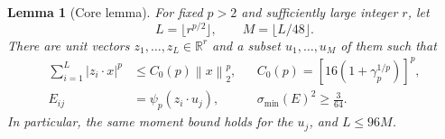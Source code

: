 \documentclass[11pt,letterpaper]{article}
\newtheorem{lemma}[theorem]{Lemma}
\theoremstyle{definition}
\theoremstyle{remark}
\numberwithin{equation}{section}
\newcommand{\R}{\mathbb R}
\newcommand{\norm}[1]{\left\lVert#1\right\rVert}
\begin{document}
\begin{lemma}[Core lemma]\label{lem:core}
For fixed $p>2$ and sufficiently large integer $r$, let
\begin{equation}\label{eq:corecounts}
 L=\lfloor r^{p/2}\rfloor,\qquad M=\lfloor L/48\rfloor.
\end{equation}
There are unit vectors $z_1,\ldots,z_L\in\R^r$ and a subset $u_1,\ldots,u_M$ of them such that
\begin{align}
 \sum_{i=1}^L|z_i\cdot x|^p&\le C_0(p)\norm{x}_2^p,
 &&C_0(p)=[16(1+\gamma_p^{1/p})]^p,\label{eq:coremoment}\\
 E_{ij}&=\psi_p(z_i\cdot u_j),
 &&\sigma_{\min}(E)^2\ge\frac3{64}.\label{eq:coreE}
\end{align}
In particular, the same moment bound holds for the $u_j$, and $L\le96M$.
\end{lemma}
\end{document}

